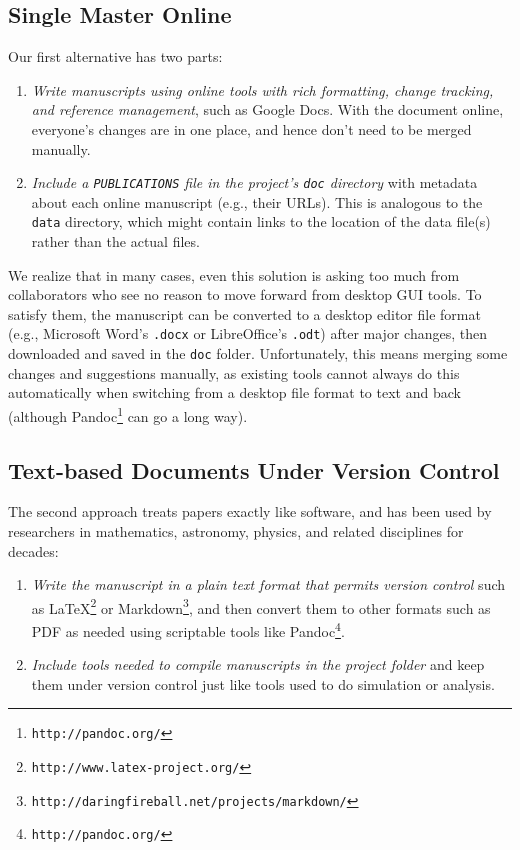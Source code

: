 \documentclass[10pt]{article}
\newcommand{\recommend}[1]{\textit{#1}}
\newcommand{\withurl}[2]{{#1}\footnote{\texttt{#2}}}
\begin{document}
\subsection*{Single Master Online}

Our first alternative has two parts:

\begin{enumerate}

\item
  \recommend{Write manuscripts using online tools with rich
    formatting, change tracking, and reference management}, such as
  Google Docs. With the document online, everyone's
  changes are in one place, and hence don't need to be merged
  manually.

\item
  \recommend{Include a \texttt{PUBLICATIONS} file in the project's
    \texttt{doc} directory} with metadata about each online manuscript
  (e.g., their URLs). This is analogous to the \texttt{data}
  directory, which might contain links to the location of the data
  file(s) rather than the actual files.

\end{enumerate}

We realize that in many cases, even this solution is asking too much
from collaborators who see no reason to move forward from desktop GUI
tools. To satisfy them, the manuscript can be converted to a desktop
editor file format (e.g., Microsoft Word's \texttt{.docx} or
LibreOffice's \texttt{.odt}) after major changes, then downloaded and
saved in the \texttt{doc} folder. Unfortunately, this means merging
some changes and suggestions manually, as existing tools cannot always
do this automatically when switching from a desktop file format to
text and back (although \withurl{Pandoc}{http://pandoc.org/} can go a
long way).

\subsection*{Text-based Documents Under Version Control}

The second approach treats papers exactly like software, and has been
used by researchers in mathematics, astronomy, physics, and related
disciplines for decades:

\begin{enumerate}

\item
  \recommend{Write the manuscript in a plain text format that permits
    version control} such as
  \withurl{LaTeX}{http://www.latex-project.org/} or
  \withurl{Markdown}{http://daringfireball.net/projects/markdown/},
  and then convert them to other formats such as PDF as needed using
  scriptable tools like \withurl{Pandoc}{http://pandoc.org/}.

\item
  \recommend{Include tools needed to compile manuscripts in the
    project folder} and keep them under version control just like
  tools used to do simulation or analysis.

\end{enumerate}
\end{document}
